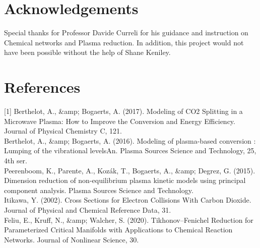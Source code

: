 \documentclass[twocolumn,10pt,a4paper]{article}
\begin{document}
\section{Acknowledgements}
Special thanks for Professor Davide Curreli for his guidance and instruction on Chemical networks and Plasma
reduction. In addition, this project would not have been possible without the help of Shane Keniley.

\section{References}
[1] Berthelot, A., \&amp; Bogaerts, A. (2017). Modeling of CO2 Splitting in a Microwave Plasma: How to Improve the Conversion and Energy Efficiency. Journal of Physical Chemistry C, 121.\\
\newline
[2] Berthelot, A., \&amp; Bogaerts, A. (2016). Modeling of plasma-based conversion : Lumping of the vibrational levelsAn. Plasma Sources Science and Technology, 25, 4th ser.\\
\newline
[3] Peerenboom, K., Parente, A., Kozák, T., Bogaerts, A., \&amp; Degrez, G. (2015). Dimension reduction of non-equilibrium plasma kinetic models using principal component analysis. Plasma Sources Science and Technology.\\
\newline
[4] Itikawa, Y. (2002). Cross Sections for Electron Collisions With Carbon Dioxide. Journal of Physical and Chemical Reference Data, 31.\\
\newline
[5] Feliu, E., Kruff, N., \&amp; Walcher, S. (2020). Tikhonov–Fenichel Reduction for Parameterized Critical Manifolds with Applications to Chemical Reaction Networks. Journal of Nonlinear Science, 30.
\end{document}
